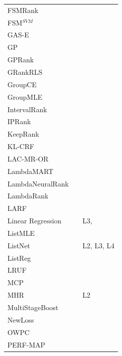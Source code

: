 \documentclass[english, authoryear, preprint]{elsarticle}
\begin{document}
{\begin{longtable}{p{2.671cm}p{2.812cm}p{7.7cm}}
FSMRank & \cite{Lai2013c} & \cite{Lai2013c,Laporte2013} \\ 
FSM$^{SVM}$ & \cite{Lai2013c} & \cite{Lai2013c} \\
GAS-E & \cite{Geng2007} & \cite{Lai2013c} \\ 
GP & \cite{DeAlmeida2007} & \cite{Alcantara2010} \\
GPRank & \cite{Silva2009} & \cite{Torkestani2012} \\  
GRankRLS & \cite{Pahikkala2010} & \cite{Pahikkala2010} \\
GroupCE & \cite{Lin2011} & \cite{Lin2011} \\ 
GroupMLE & \cite{Lin2010} & \cite{Lin2011} \\ 
IntervalRank & \cite{Moon2010} & \cite{Moon2010, Freno2011} \\
IPRank & \cite{Wang2009b} & \cite{Wang2009b, Torkestani2012} \\ 
KeepRank & \cite{Chen2009} & \cite{Chen2009} \\
KL-CRF & \cite{Volkovs2011} & \cite{Volkovs2011} \\ 
LAC-MR-OR & \cite{Veloso2008} & \cite{Veloso2008, Alcantara2010} \\ 
LambdaMART & \cite{Burges2010} & \cite{Asadi2013a, Ganjisaffar2011c} \\ 
LambdaNeuralRank & \cite{Papini2012} & \cite{Papini2012} \\ 
LambdaRank & \cite{Burges2006} & \cite{Papini2012, Tan2013} \\ 
LARF & \cite{Torkestani2012} & \cite{Torkestani2012} \\
Linear Regression & \cite{Cossock2006} & L3, \cite{Wang2012, Volkovs2011} \\
ListMLE & \cite{Xia2008} & \cite{Lin2010, Lin2011, Gao2014} \\
ListNet & \cite{Cao2007} & L2, L3, L4 \\
ListReg & \cite{Wu2011} & \cite{Wu2011}\\
LRUF & \cite{Torkestani2012b} & \cite{Torkestani2012b}\\
MCP & \cite{Laporte2013} & \cite{Laporte2013}\\
MHR & \cite{Qin2007} & L2\\
MultiStageBoost & \cite{Kao2013} & \cite{Kao2013}\\
NewLoss & \cite{Peng2010} & \cite{Peng2010}\\
OWPC & \cite{Usunier2009} & \cite{Usunier2009}\\
PERF-MAP & \cite{Pan2011} & \cite{Torkestani2012b}\\

\end{longtable}}
\end{document}
